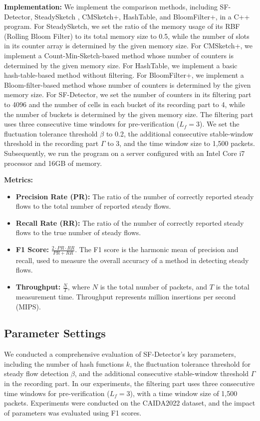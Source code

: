 \documentclass[preprint,12pt]{elsarticle}
\begin{document}
\textbf{Implementation:}
We implement the comparison methods, including SF-Detector, SteadySketch \cite{b23}, CMSketch+, HashTable, and BloomFilter+, in a C++ program. For SteadySketch, we set the ratio of the memory usage of its RBF (Rolling Bloom Filter) to its total memory size to 0.5, while the number of slots in its counter array is determined by the given memory size. For CMSketch+, we implement a Count-Min-Sketch-based method whose number of counters is determined by the given memory size. For HashTable, we implement a basic hash-table-based method without filtering. For BloomFilter+, we implement a Bloom-filter-based method whose number of counters is determined by the given memory size. For SF-Detector, we set the number of counters in its filtering part to 4096 and the number of cells in each bucket of its recording part to 4, while the number of buckets is determined by the given memory size. The filtering part uses three consecutive time windows for pre-verification ($L_f = 3$). We set the fluctuation tolerance threshold $\beta$ to 0.2, the additional consecutive stable-window threshold in the recording part $\Gamma$ to 3, and the time window size to 1,500 packets. Subsequently, we run the program on a server configured with an Intel Core i7 processor and 16GB of memory.

\textbf{Metrics:}
\begin{itemize}
    \item \textbf{Precision Rate (PR):} The ratio of the number of correctly reported steady flows to the total number of reported steady flows.
    \item \textbf{Recall Rate (RR):} The ratio of the number of correctly reported steady flows to the true number of steady flows.
    \item \textbf{F1 Score:} $\frac{2 \cdot PR \cdot RR}{PR + RR}$. The F1 score is the harmonic mean of precision and recall, used to measure the overall accuracy of a method in detecting steady flows.
    \item \textbf{Throughput:} $\frac{N}{T}$, where $N$ is the total number of packets, and $T$ is the total measurement time. Throughput represents million insertions per second (MIPS).
\end{itemize}

\subsection{Parameter Settings}
We conducted a comprehensive evaluation of SF-Detector's key parameters, including the number of hash functions $k$, the fluctuation tolerance threshold for steady flow detection $\beta$, and the additional consecutive stable-window threshold $\Gamma$ in the recording part. In our experiments, the filtering part uses three consecutive time windows for pre-verification ($L_f = 3$), with a time window size of 1,500 packets. Experiments were conducted on the CAIDA2022 dataset, and the impact of parameters was evaluated using F1 scores.
\end{document}
